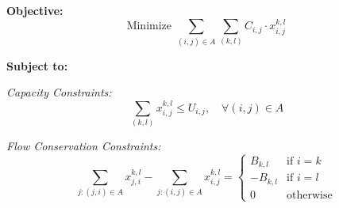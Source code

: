 \documentclass{article}
\begin{document}
\textbf{Objective:}
\[
\text{Minimize } \sum_{(i,j) \in A} \sum_{(k,l)} C_{i,j} \cdot x_{i,j}^{k,l}
\]

\textbf{Subject to:}

\textit{Capacity Constraints:}
\[
\sum_{(k,l)} x_{i,j}^{k,l} \leq U_{i,j}, \quad \forall (i,j) \in A
\]

\textit{Flow Conservation Constraints:}
\[
\sum_{j: (j,i) \in A} x_{j,i}^{k,l} - \sum_{j: (i,j) \in A} x_{i,j}^{k,l} = 
\begin{cases} 
B_{k,l} & \text{if } i = k \\
-B_{k,l} & \text{if } i = l \\
0 & \text{otherwise}
\end{cases}
\]
\end{document}
